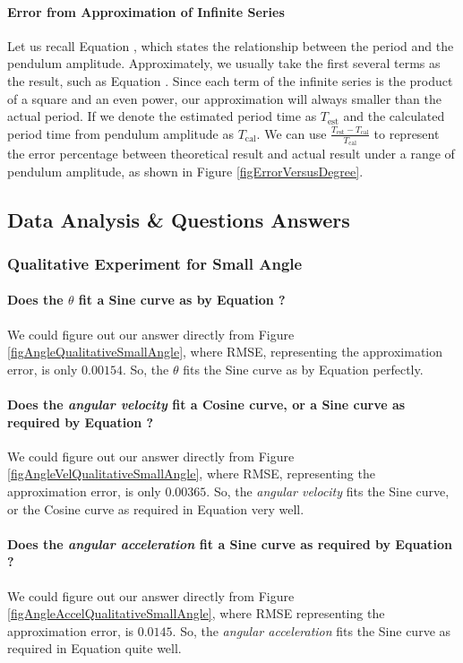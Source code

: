 \paragraph{Error from Approximation of Infinite Series}
Let us recall Equation , which states the relationship between the period and the pendulum amplitude. Approximately, we usually take the first several terms as the result, such as Equation . Since each term of the infinite series is the product of a square and an even power, our approximation will always smaller than the actual period. If we denote the estimated period time as $T_{\text{est}}$ and the calculated period time from pendulum amplitude as $T_{\text{cal}}$. We can use $\frac{T_{\text{est}}-T_{\text{cal}}}{T_{\text{cal}}}$ to represent the error percentage between theoretical result and actual result under a range of pendulum amplitude, as shown in Figure \ref{figErrorVersusDegree}.

\subsection{Data Analysis \& Questions Answers}
\subsubsection{Qualitative Experiment for Small Angle}

\paragraph{Does the $\theta$ fit a Sine curve as by Equation ?}
We could figure out our answer directly from Figure \ref{figAngleQualitativeSmallAngle}, where RMSE, representing the approximation error, is only $0.00154$. So, the $\theta$ fits the Sine curve as by Equation  perfectly.

\paragraph{Does the \emph{angular velocity} fit a Cosine curve, or a Sine curve as required by Equation ?}
We could figure out our answer directly from Figure \ref{figAngleVelQualitativeSmallAngle}, where RMSE, representing the approximation error, is only $0.00365$. So, the \emph{angular velocity} fits the Sine curve, or the Cosine curve as required in Equation  very well.

\paragraph{Does the \emph{angular acceleration} fit a Sine curve as required by Equation ?}
We could figure out our answer directly from Figure \ref{figAngleAccelQualitativeSmallAngle}, where RMSE representing the approximation error, is $0.0145$. So, the \emph{angular acceleration} fits the Sine curve as required in Equation  quite well.

